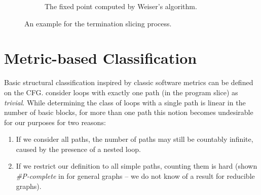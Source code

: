 \begin{figure}
\begin{subfigure}{.48\linewidth}
        \caption{The fixed point computed by Weiser's algorithm.}
        \label{fig:slicing_ex_d}
    \end{subfigure}
    \caption{An example for the termination slicing process.}
    \label{fig:slicing_ex}
\end{figure}

\section{Metric-based Classification}
\label{sec:class_cfg}

Basic structural classification inspired by classic software metrics can be defined on the CFG. \citeauthor{DBLP:conf/sas/ZulegerGSV11} \cite{DBLP:conf/sas/ZulegerGSV11} consider loops with exactly one path (in the program slice) as \emph{trivial}. While determining the class of loops with a single path is linear in the number of basic blocks, for more than one path this notion becomes undesirable for our purposes for two reasons:
\begin{enumerate}
    \item If we consider all paths, the number of paths may still be countably infinite, caused by the presence of a nested loop.
    \item If we restrict our definition to all simple paths, counting them is hard (shown \emph{\#P-complete} in \cite{DBLP:journals/siamcomp/Valiant79} for general graphs -- we do not know of a result for reducible graphs).
\end{enumerate}

